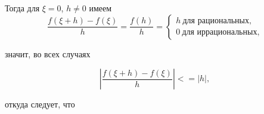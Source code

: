 \documentclass[12pt,cmcyralt]{book} %
\begin{document}
\noindent Тогда для $\xi = 0$, $h \neq 0$ имеем
$$\frac{f(\xi + h)-f(\xi)}{h} = \frac{f(h)}{h} = 
\begin{cases} 
h \  \text{для рациональных,}\\
0 \ \text{для иррациональных,}
\end{cases}$$ 

\newpage
\pagestyle{fancy} 
\noindent з\hspace{1 pt}н\hspace{1 pt}а\hspace{1 pt}ч\hspace{1 pt}и\hspace{1 pt}т\hspace{1 pt},\hspace{1 pt} \hspace{1 pt}в\hspace{1 pt}о\hspace{1 pt} \hspace{1 pt}в\hspace{1 pt}с\hspace{1 pt}е\hspace{1 pt}х\hspace{1 pt} \hspace{1 pt}с\hspace{1 pt}л\hspace{1 pt}у\hspace{1 pt}ч\hspace{1 pt}а\hspace{1 pt}я\hspace{1 pt}х 

\[
\left | \frac{f(\xi + h) - f(\xi)}{h} \right | <= |h| ,
\]

\noindent о\hspace{1 pt}т\hspace{1 pt}к\hspace{1 pt}у\hspace{1 pt}д\hspace{1 pt}а\hspace{1 pt} \hspace{1 pt}с\hspace{1 pt}л\hspace{1 pt}е\hspace{1 pt}д\hspace{1 pt}у\hspace{1 pt}е\hspace{1 pt}т\hspace{1 pt},\hspace{1 pt} \hspace{1 pt}ч\hspace{1 pt}т\hspace{1 pt}о 
\end{document}
